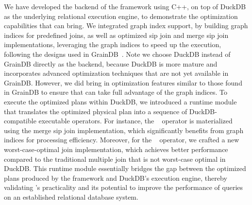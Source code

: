 We have developed the backend of the \name framework using C++, on top of DuckDB as the underlying relational execution engine, to demonstrate the optimization capabilities that \name can bring.
We integrated graph index support, by building graph indices for predefined joins, as well as optimized sip join and merge sip join implementations, leveraging the graph indices to speed up the execution, following the designs used in GrainDB~\cite{graindb}.
Note we choose DuckDB instead of GrainDB directly as the backend, because DuckDB is more mature and incorporates advanced optimization techniques that are not yet available in GrainDB.
However, we did bring in optimization features similar to those found in GrainDB to ensure that \name can take full advantage of the graph indices.
To execute the optimized plans within DuckDB, we introduced a runtime module that translates the optimized physical plan into a sequence of DuckDB-compatible executable operators.
For instance, the \expand~ operator is materialized using the merge sip join implementation, which significantly benefits from graph indices for processing efficiency.
Moreover, for the \intersect~ operator, we crafted a new worst-case-optimal join implementation, which achieves better performance compared to the traditional multiple join that is not worst-case optimal in DuckDB.
This runtime module essentially bridges the gap between the optimized plans produced by the \name framework and DuckDB's execution engine, thereby validating \name's practicality and its potential to improve the performance of \spjm queries on an established relational database system.


